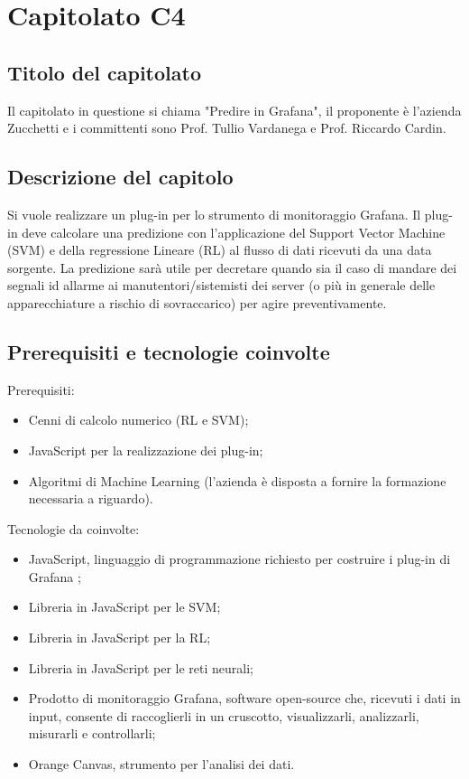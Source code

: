 \section{Capitolato C4}
\subsection{Titolo del capitolato}
Il capitolato in questione si chiama "Predire in Grafana", il proponente \`e l'azienda Zucchetti e i committenti sono Prof. Tullio Vardanega e Prof. Riccardo Cardin.

\subsection{Descrizione del capitolo}
Si vuole realizzare un plug-in per lo strumento di monitoraggio Grafana. Il plug-in deve calcolare una predizione con l'applicazione del Support Vector Machine (SVM) e della regressione Lineare (RL) al flusso di dati ricevuti da una data sorgente. La predizione sar\`a utile per decretare quando sia il caso di mandare dei segnali id allarme ai manutentori/sistemisti dei server (o pi\`u in generale delle apparecchiature a rischio di sovraccarico) per agire preventivamente.

\subsection{Prerequisiti e tecnologie coinvolte}
Prerequisiti:
\begin{itemize}
\item Cenni di calcolo numerico (RL e SVM);
\item JavaScript per la realizzazione dei plug-in;
\item Algoritmi di Machine Learning (l'azienda \`e disposta a fornire la formazione necessaria a riguardo).
\end{itemize}
Tecnologie da coinvolte:
\begin{itemize}
\item JavaScript, linguaggio di programmazione richiesto per costruire i plug-in di Grafana ;
\item Libreria in JavaScript per le SVM;
\item Libreria in JavaScript per la RL;
\item Libreria in JavaScript per le reti neurali;
\item Prodotto di monitoraggio Grafana, software open-source che, ricevuti i dati in input, consente di raccoglierli in un cruscotto, visualizzarli, analizzarli, misurarli e controllarli;
\item Orange Canvas, strumento per l'analisi dei dati.
\end{itemize}


